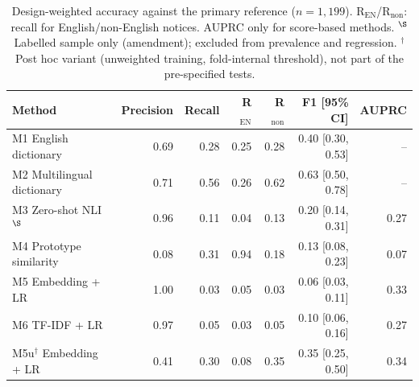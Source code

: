 \documentclass[runningheads]{llncs}
\begin{document}
\begin{table}[t]
\caption{Design-weighted accuracy against the primary reference ($n=1{,}199$). R$_\mathrm{EN}$/R$_\mathrm{non}$: recall for English/non-English notices. AUPRC only for score-based methods. $^\S$Labelled sample only (amendment); excluded from prevalence and regression. $^\dagger$Post hoc variant (unweighted training, fold-internal threshold), not part of the pre-specified tests.}\label{tab:acc}
\centering
\begin{tabular}{lrrrrrr}
\toprule
Method & Precision & Recall & R$_\mathrm{EN}$ & R$_\mathrm{non}$ & F1 [95\% CI] & AUPRC \\
\midrule
M1 English dictionary & 0.69 & 0.28 & 0.25 & 0.28 & 0.40 [0.30, 0.53] & -- \\
M2 Multilingual dictionary & 0.71 & 0.56 & 0.26 & 0.62 & 0.63 [0.50, 0.78] & -- \\
M3 Zero-shot NLI$^\S$ & 0.96 & 0.11 & 0.04 & 0.13 & 0.20 [0.14, 0.31] & 0.27 \\
M4 Prototype similarity & 0.08 & 0.31 & 0.94 & 0.18 & 0.13 [0.08, 0.23] & 0.07 \\
M5 Embedding + LR & 1.00 & 0.03 & 0.05 & 0.03 & 0.06 [0.03, 0.11] & 0.33 \\
M6 TF-IDF + LR & 0.97 & 0.05 & 0.03 & 0.05 & 0.10 [0.06, 0.16] & 0.27 \\
M5u$^\dagger$ Embedding + LR & 0.41 & 0.30 & 0.08 & 0.35 & 0.35 [0.25, 0.50] & 0.34 \\
\bottomrule
\end{tabular}
\end{table}
\end{document}
